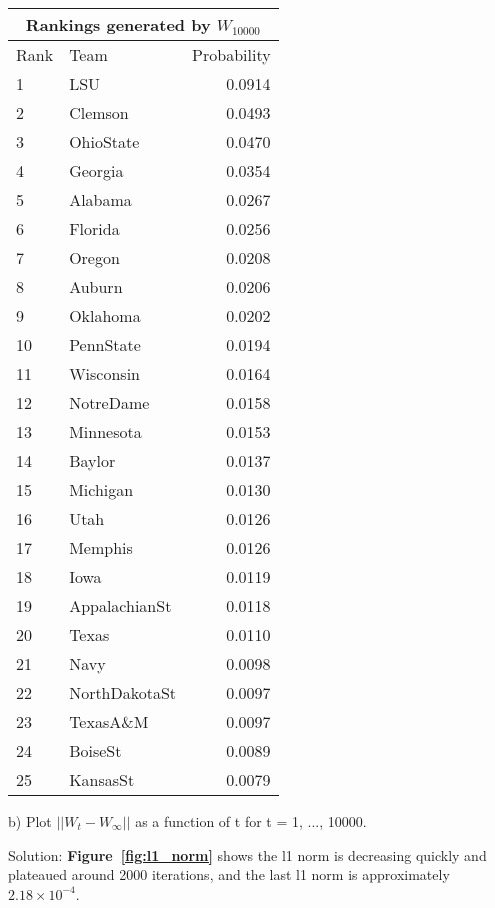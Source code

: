 \documentclass[11pt]{report}
\begin{document}
{\begin{tabular}{llr}
\toprule
  \multicolumn{3}{c}{Rankings generated by $W_{10000}$} \\
\toprule
 Rank &          Team &  Probability \\
\midrule
    1 &           LSU &       0.0914 \\
    2 &       Clemson &       0.0493 \\
    3 &     OhioState &       0.0470 \\
    4 &       Georgia &       0.0354 \\
    5 &       Alabama &       0.0267 \\
    6 &       Florida &       0.0256 \\
    7 &        Oregon &       0.0208 \\
    8 &        Auburn &       0.0206 \\
    9 &      Oklahoma &       0.0202 \\
   10 &     PennState &       0.0194 \\
   11 &     Wisconsin &       0.0164 \\
   12 &     NotreDame &       0.0158 \\
   13 &     Minnesota &       0.0153 \\
   14 &        Baylor &       0.0137 \\
   15 &      Michigan &       0.0130 \\
   16 &          Utah &       0.0126 \\
   17 &       Memphis &       0.0126 \\
   18 &          Iowa &       0.0119 \\
   19 & AppalachianSt &       0.0118 \\
   20 &         Texas &       0.0110 \\
   21 &          Navy &       0.0098 \\
   22 & NorthDakotaSt &       0.0097 \\
   23 &      TexasA\&M &       0.0097 \\
   24 &       BoiseSt &       0.0089 \\
   25 &      KansasSt &       0.0079 \\
\bottomrule
\end{tabular}
}

\pagebreak

\justify 
b) Plot $||W_{t} - W_{\infty}||$ as a function of t for t = 1, ..., 10000.

\justify Solution: \textbf{Figure~\ref{fig:l1_norm}} shows the l1 norm is decreasing quickly and plateaued around 2000 iterations, and the last l1 norm is approximately $2.18\times10^{-4}$.
\end{document}
